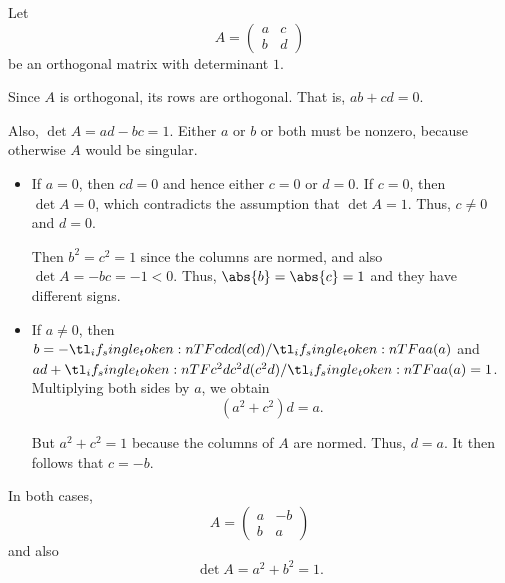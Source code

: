 \begin{defproof}
  Let
  \begin{equation*}
    A = \begin{pmatrix}
      a & c \\
      b & d
    \end{pmatrix}
  \end{equation*}
  be an orthogonal matrix with determinant \( 1 \).

  Since \( A \) is orthogonal, its rows are orthogonal. That is, \( ab + cd = 0 \).

  Also, \( \det A = ad - bc = 1 \). Either \( a \) or \( b \) or both must be nonzero, because otherwise \( A \) would be singular.
  \begin{itemize}
    \item If \( a = 0 \), then \( cd = 0 \) and hence either \( c = 0 \) or \( d = 0 \). If \( c = 0 \), then \( \det A = 0 \), which contradicts the assumption that \( \det A = 1 \). Thus, \( c \neq 0 \) and \( d = 0 \).

    Then \( b^2 = c^2 = 1 \) since the columns are normed, and also \( \det A = -bc = -1 < 0 \). Thus, \( \abs{b} = \abs{c} = 1 \) and they have different signs.

    \item If \( a \neq 0 \), then \( b = -\ifrac {cd} a \) and \( ad + \ifrac {c^2 d} a = 1 \). Multiplying both sides by \( a \), we obtain
    \begin{equation*}
      (a^2 + c^2) d = a.
    \end{equation*}

    But \( a^2 + c^2 = 1 \) because the columns of \( A \) are normed. Thus, \( d = a \). It then follows that \( c = -b \).
  \end{itemize}

  In both cases,
  \begin{equation*}
    A
    =
    \begin{pmatrix}
      a & -b \\
      b & a
    \end{pmatrix}
  \end{equation*}
  and also
  \begin{equation*}
    \det A = a^2 + b^2 = 1.
  \end{equation*}
\end{defproof}

